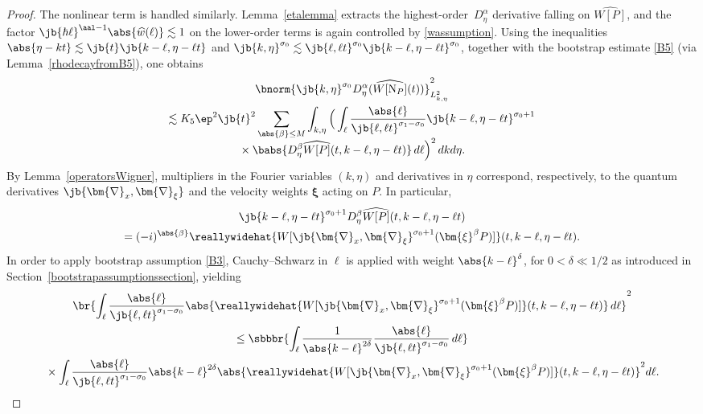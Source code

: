 \begin{proof}
The nonlinear term is handled similarly. Lemma~\ref{etalemma} extracts the highest-order~$D^\alpha_\eta$ derivative falling on $\widehat{W[P]}$, and the factor $\jb{\hbar\ell}^{\aal-1}\abs{\widehat w(\ell)}\lesssim1$ on the lower-order terms is again controlled by \eqref{wassumption}. Using the inequalities $\abs{\eta-kt}\lesssim\jb{t}\jb{k-\ell ,\eta-\ell t}$ and $\jb{k,\eta}^{\sigma_0}\lesssim\jb{\ell ,\ell t}^{\sigma_0}\jb{k-\ell ,\eta-\ell t}^{\sigma_0}$, together with the bootstrap estimate \eqref{B5} (via Lemma~\ref{rhodecayfromB5}), one obtains
\begin{multline*}
\bnorm{\jb{k,\eta}^{\sigma_0}D^\alpha_\eta(\widehat {W[{\mathrm{N}_P}]}(t))}^2_{L^2_{k,\eta}}\\
\lesssim K_5\ep^2\jb{t}^2\sum_{\abs{\beta}\leq M}\int_{k,\eta}\Big(\int_\ell \frac{\abs{\ell }}{\jb{\ell ,\ell t}^{\sigma_1-\sigma_0}}\jb{k-\ell ,\eta-\ell t}^{\sigma_0+1}\\[-5pt]
{}\times\babs{D_\eta^\beta\widehat{W[P]}(t,k-\ell ,\eta-\ell t)}\,d\ell \Big)^2\,dkd\eta.
\end{multline*}
By Lemma~\ref{operatorsWigner}, multipliers in the Fourier variables $(k,\eta)$ and derivatives in $\eta$ correspond, respectively, to the quantum derivatives $\jb{\bm{\nabla}_x,\bm{\nabla}_\xi}$ and the velocity weights $\bm{\xi}$ acting on $P$. In particular,
\begin{multline*}
\jb{k-\ell ,\eta-\ell t}^{\sigma_0+1}D_\eta^\beta\widehat{W[P]}(t,k-\ell ,\eta-\ell t)
\\
=(-i)^{\abs{\beta}}\reallywidehat{W[\jb{\bm{\nabla}_x,\bm{\nabla}_\xi}^{\sigma_0+1}(\bm{\xi}^\beta P)]}(t,k-\ell ,\eta-\ell t).
\end{multline*}
In order to apply bootstrap assumption \eqref{B3}, Cauchy--Schwarz in $\ell$ is applied with weight $\abs{k-\ell}^{\delta}$, for $0<\delta\ll1/2$ as introduced in Section~\ref{bootstrapassumptionssection}, yielding
\begin{multline*}
\br{\int_\ell \frac{\abs{\ell }}{\jb{\ell ,\ell t}^{\sigma_1-\sigma_0}}\abs{\reallywidehat{W[\jb{\bm{\nabla}_x,\bm{\nabla}_\xi}^{\sigma_0+1}(\bm{\xi}^\beta P)]}(t,k-\ell ,\eta-\ell t)}\,d\ell}^{2} \\
\leq \sbbbr{\int_\ell \frac{1}{\abs{k-\ell }^{2\delta}}\frac{\abs{\ell }}{\jb{\ell ,\ell t}^{\sigma_1-\sigma_0}}\,d\ell }\\
{}\times\int_\ell \frac{\abs{\ell }}{\jb{\ell ,\ell t}^{\sigma_1-\sigma_0}}\abs{k-\ell }^{2\delta}\abs{\reallywidehat{W[\jb{\bm{\nabla}_x,\bm{\nabla}_\xi}^{\sigma_0+1}(\bm{\xi}^\beta P)]}(t,k-\ell ,\eta-\ell t)}^2d\ell.

\end{multline*}
\end{proof}
